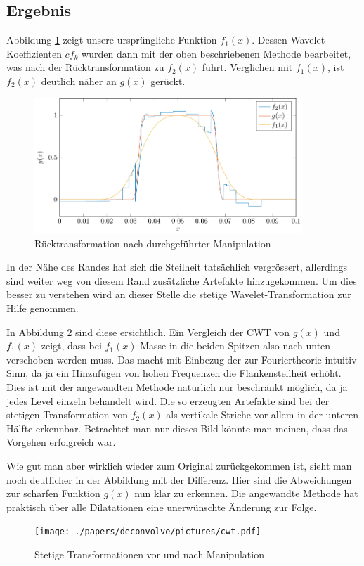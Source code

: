 \subsection{Ergebnis}
Abbildung \ref{deconvolve:result_1d} zeigt unsere ursprüngliche Funktion $f_1(x)$.
Dessen Wavelet-Koeffizienten $cf_k$ wurden dann mit der oben beschriebenen Methode bearbeitet, was nach der Rücktransformation zu $f_2(x)$ führt.
Verglichen mit $f_1(x)$, ist $f_2(x)$ deutlich näher an $g(x)$ gerückt.
\begin{figure}[h]
\centering
\includegraphics[width=0.9\textwidth]{./papers/deconvolve/pictures/result_1d.pdf}
\caption{Rücktransformation nach durchgeführter Manipulation\label{deconvolve:result_1d}}
\end{figure}

In der Nähe des Randes hat sich die Steilheit tatsächlich vergrössert, allerdings sind weiter weg von diesem Rand zusätzliche Artefakte hinzugekommen.
Um dies besser zu verstehen wird an dieser Stelle die stetige Wavelet-Transformation zur Hilfe genommen.

In Abbildung \ref{deconvolve:cwt} sind diese ersichtlich.
Ein Vergleich der CWT von $g(x)$ und $f_1(x)$ zeigt, dass bei $f_1(x)$ \glqq Masse\grqq{} in die beiden Spitzen also nach unten verschoben werden muss.
Das macht mit Einbezug der zur Fouriertheorie intuitiv Sinn, da ja ein Hinzufügen von hohen Frequenzen die Flankensteilheit erhöht.
Dies ist mit der angewandten Methode natürlich nur beschränkt möglich, da ja jedes Level einzeln behandelt wird.
Die so erzeugten Artefakte sind bei der stetigen Transformation von $f_2(x)$ als vertikale Striche vor allem in der unteren Hälfte erkennbar.
Betrachtet man nur dieses Bild könnte man meinen, dass das Vorgehen erfolgreich war.

Wie gut man aber wirklich wieder zum Original zurückgekommen ist, sieht man noch deutlicher in der Abbildung mit der Differenz.
Hier sind die Abweichungen zur  scharfen Funktion $g(x)$ nun klar zu erkennen.
Die angewandte Methode hat praktisch über alle Dilatationen eine unerwünschte Änderung zur Folge.

\begin{figure}[h]
\centering
\texttt{[image: ./papers/deconvolve/pictures/cwt.pdf]}
\caption{Stetige Transformationen vor und nach Manipulation\label{deconvolve:cwt}}
\end{figure}

